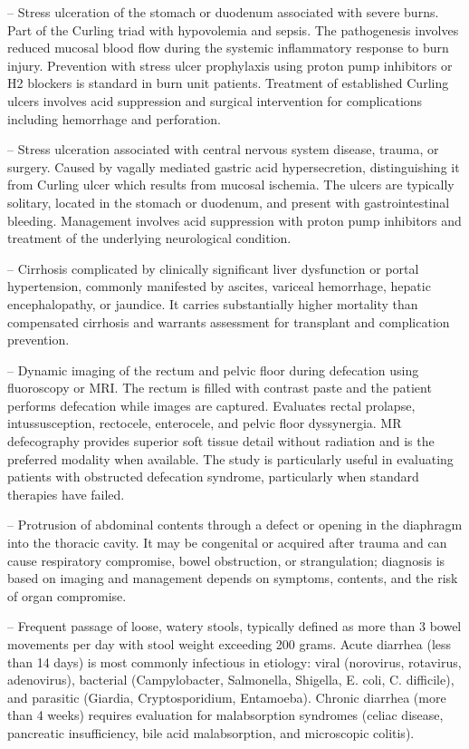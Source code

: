 -- Stress ulceration of the stomach or duodenum associated with severe burns. Part of the Curling triad with hypovolemia and sepsis. The pathogenesis involves reduced mucosal blood flow during the systemic inflammatory response to burn injury. Prevention with stress ulcer prophylaxis using proton pump inhibitors or H2 blockers is standard in burn unit patients. Treatment of established Curling ulcers involves acid suppression and surgical intervention for complications including hemorrhage and perforation.

-- Stress ulceration associated with central nervous system disease, trauma, or surgery. Caused by vagally mediated gastric acid hypersecretion, distinguishing it from Curling ulcer which results from mucosal ischemia. The ulcers are typically solitary, located in the stomach or duodenum, and present with gastrointestinal bleeding. Management involves acid suppression with proton pump inhibitors and treatment of the underlying neurological condition.

-- Cirrhosis complicated by clinically significant liver dysfunction or portal hypertension, commonly manifested by ascites, variceal hemorrhage, hepatic encephalopathy, or jaundice. It carries substantially higher mortality than compensated cirrhosis and warrants assessment for transplant and complication prevention.

-- Dynamic imaging of the rectum and pelvic floor during defecation using fluoroscopy or MRI. The rectum is filled with contrast paste and the patient performs defecation while images are captured. Evaluates rectal prolapse, intussusception, rectocele, enterocele, and pelvic floor dyssynergia. MR defecography provides superior soft tissue detail without radiation and is the preferred modality when available. The study is particularly useful in evaluating patients with obstructed defecation syndrome, particularly when standard therapies have failed.

-- Protrusion of abdominal contents through a defect or opening in the diaphragm into the thoracic cavity. It may be congenital or acquired after trauma and can cause respiratory compromise, bowel obstruction, or strangulation; diagnosis is based on imaging and management depends on symptoms, contents, and the risk of organ compromise.

-- Frequent passage of loose, watery stools, typically defined as more than 3 bowel movements per day with stool weight exceeding 200 grams. Acute diarrhea (less than 14 days) is most commonly infectious in etiology: viral (norovirus, rotavirus, adenovirus), bacterial (Campylobacter, Salmonella, Shigella, E. coli, C. difficile), and parasitic (Giardia, Cryptosporidium, Entamoeba). Chronic diarrhea (more than 4 weeks) requires evaluation for malabsorption syndromes (celiac disease, pancreatic insufficiency, bile acid malabsorption, and microscopic colitis).

